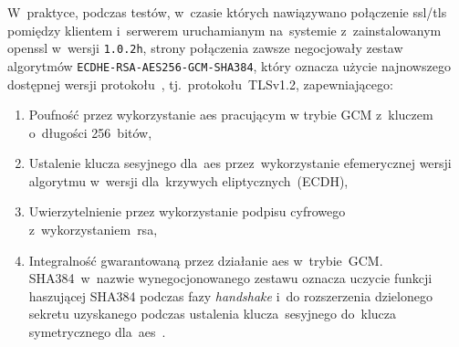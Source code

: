 \documentclass[thesis]{subfiles}
\begin{document}
W~praktyce, podczas testów, w~czasie których nawiązywano połączenie \gls{ssl/tls} pomiędzy klientem i~serwerem uruchamianym na~systemie z~zainstalowanym \gls{openssl} w~wersji \texttt{1.0.2h}, strony połączenia zawsze negocjowały zestaw algorytmów \texttt{ECDHE-RSA-AES256-GCM-SHA384}, który oznacza użycie najnowszego dostępnej wersji protokołu~, tj.~protokołu~TLSv1.2, zapewniającego:
\begin{enumerate}
\item Poufność przez wykorzystanie \gls{aes} pracującym w trybie GCM z~kluczem o~długości 256~bitów,
\item Ustalenie klucza sesyjnego dla~\gls{aes} przez~wykorzystanie efemerycznej wersji algorytmu  w~wersji dla~krzywych eliptycznych~(ECDH),
\item Uwierzytelnienie przez wykorzystanie podpisu cyfrowego z~wykorzystaniem~\gls{rsa},
\item Integralność gwarantowaną przez działanie \gls{aes} w~trybie~GCM. SHA384~w~nazwie wynegocjonowanego zestawu oznacza uczycie funkcji haszującej SHA384 podczas fazy \emph{handshake} i~do rozszerzenia dzielonego sekretu uzyskanego podczas ustalenia klucza~sesyjnego do~klucza symetrycznego dla~\gls{aes}~\cite{stack:openssl-sha-gcm}.
\end{enumerate}
\end{document}

